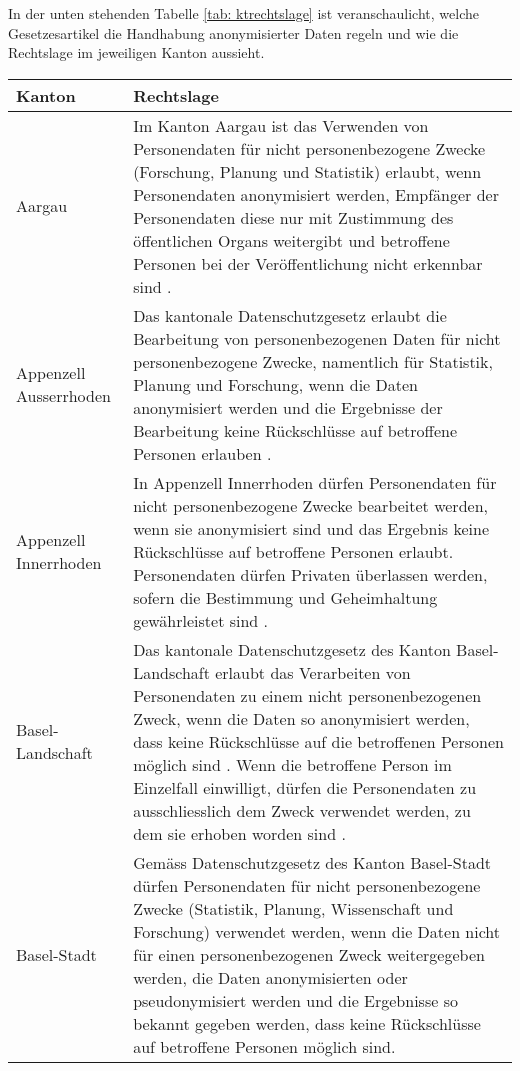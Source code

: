 In der unten stehenden Tabelle \ref{tab: ktrechtslage} ist veranschaulicht, welche Gesetzesartikel die Handhabung anonymisierter Daten regeln und wie die Rechtslage im jeweiligen Kanton aussieht.

\begin{longtable}{| p{} | p{}|} 
		\hline
		\textbf{Kanton} & \textbf{Rechtslage}  \\ 
    \hline
    Aargau & Im Kanton Aargau ist das Verwenden von Personendaten für nicht personenbezogene Zwecke (Forschung, Planung und Statistik) erlaubt, wenn Personendaten anonymisiert werden, Empfänger der Personendaten diese nur mit Zustimmung des öffentlichen Organs weitergibt und betroffene Personen bei der Veröffentlichung nicht erkennbar sind \parencite[§§ 19 Abs. 1]{DSSGAARGAU}. \\
    \hline
		Appenzell Ausserrhoden & Das kantonale Datenschutzgesetz erlaubt die Bearbeitung von personenbezogenen Daten für nicht personenbezogene Zwecke, namentlich für Statistik, Planung und Forschung, wenn die Daten anonymisiert werden und die Ergebnisse der Bearbeitung keine Rückschlüsse auf betroffene Personen erlauben \parencite[§§ 14 Abs. 1]{DSSGAARh}. \\
    \hline
		Appenzell Innerrhoden & In Appenzell Innerrhoden dürfen Personendaten für nicht personenbezogene Zwecke bearbeitet werden, wenn sie anonymisiert sind und das Ergebnis keine Rückschlüsse auf betroffene Personen erlaubt. Personendaten dürfen Privaten überlassen werden, sofern die Bestimmung und Geheimhaltung gewährleistet sind \parencite[§§ 7 Abs 1-2]{DSSGAIRh}.\\
    \hline
		Basel-Landschaft & Das kantonale Datenschutzgesetz des Kanton Basel-Landschaft erlaubt das Verarbeiten von Personendaten zu einem nicht personenbezogenen Zweck, wenn die Daten so anonymisiert werden, dass keine Rückschlüsse auf die betroffenen Personen möglich sind \parencite[§§ 11 Abs. 2]{DSSGBL}. Wenn die betroffene Person im Einzelfall einwilligt, dürfen die Personendaten zu ausschliesslich dem Zweck verwendet werden, zu dem sie erhoben worden sind \parencite[§§ 11 Abs. 1]{DSSGBL}. \\
		\hline
		Basel-Stadt &  Gemäss Datenschutzgesetz des Kanton Basel-Stadt \parencite[§§ 10 Abs. 1]{DSSGBS} dürfen Personendaten für nicht personenbezogene Zwecke (Statistik, Planung, Wissenschaft und Forschung) verwendet werden, wenn die Daten nicht für einen personenbezogenen Zweck weitergegeben werden, die Daten anonymisierten oder pseudonymisiert werden und die Ergebnisse so bekannt gegeben werden, dass keine Rückschlüsse auf betroffene Personen möglich sind. \\

\end{longtable}
